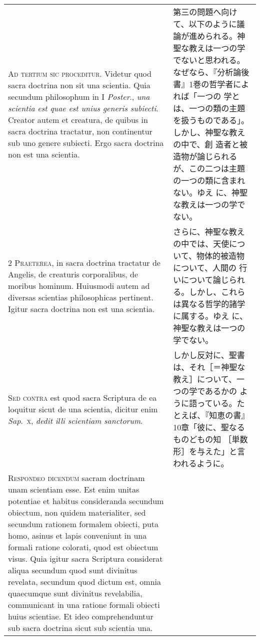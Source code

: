 \documentclass[10pt]{jsarticle}
\begin{document}
\begin{longtable}{p{21em}p{21em}}

{\huge A}{\scshape d tertium sic proceditur}. Videtur quod sacra
doctrina non sit una scientia. Quia secundum philosophum in I {\itshape
Poster}., {\itshape una scientia est quae est unius generis
subiecti}. Creator autem et creatura, de quibus in sacra doctrina
tractatur, non continentur sub uno genere subiecti. Ergo sacra doctrina
non est una scientia.

&

第三の問題へ向けて、以下のように議論が進められる。神聖な教えは一つの学
でないと思われる。なぜなら、『分析論後書』1巻の哲学者によれば「一つの
学とは、一つの類の主題を扱うものである」。しかし、神聖な教えの中で、創
造者と被造物が論じられるが、この二つは主題の一つの類に含まれない。ゆえ
に、神聖な教えは一つの学でない。

\\


{\scshape 2 Praeterea}, in sacra doctrina tractatur de Angelis, de
creaturis corporalibus, de moribus hominum. Huiusmodi autem ad
diversas scientias philosophicas pertinent. Igitur sacra doctrina non
est una scientia.


&

さらに、神聖な教えの中では、天使について、物体的被造物について、人間の
行いについて論じられる。しかし、これらは異なる哲学的諸学に属する。ゆえ
に、神聖な教えは一つの学でない。

\\


{\scshape Sed contra} est quod sacra Scriptura de ea loquitur sicut de
una scientia, dicitur enim {\itshape Sap}.~{\scshape x}, {\itshape dedit
illi scientiam sanctorum}.


&

しかし反対に、聖書は、それ［＝神聖な教え］について、一つの学であるかの
ように語っている。たとえば、『知恵の書』10章「彼に、聖なるものどもの知
［単数形］を与えた」と言われるように。

\\


{\scshape Respondeo dicendum} sacram doctrinam unam scientiam
esse. Est enim unitas potentiae et habitus consideranda secundum
obiectum, non quidem materialiter, sed secundum rationem formalem
obiecti, puta homo, asinus et lapis conveniunt in una formali ratione
colorati, quod est obiectum visus. Quia igitur sacra Scriptura
considerat aliqua secundum quod sunt divinitus revelata, secundum quod
dictum est, omnia quaecumque sunt divinitus revelabilia, communicant
in una ratione formali obiecti huius scientiae. Et ideo
comprehenduntur sub sacra doctrina sicut sub scientia una.



\end{longtable}
\end{document}
